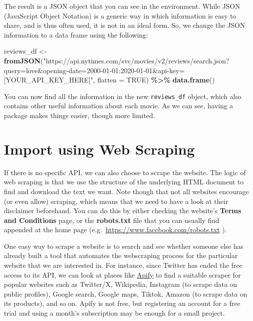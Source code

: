 \documentclass[
]{book}
\newenvironment{Shaded}{\begin{snugshade}}{\end{snugshade}}
\newcommand{\AttributeTok}[1]{\textcolor[rgb]{0.13,0.29,0.53}{#1}}
\newcommand{\ConstantTok}[1]{\textcolor[rgb]{0.56,0.35,0.01}{#1}}
\newcommand{\FunctionTok}[1]{\textcolor[rgb]{0.13,0.29,0.53}{\textbf{#1}}}
\newcommand{\NormalTok}[1]{#1}
\newcommand{\OtherTok}[1]{\textcolor[rgb]{0.56,0.35,0.01}{#1}}
\newcommand{\SpecialCharTok}[1]{\textcolor[rgb]{0.81,0.36,0.00}{\textbf{#1}}}
\newcommand{\StringTok}[1]{\textcolor[rgb]{0.31,0.60,0.02}{#1}}
\begin{document}
The result is a JSON object that you can see in the environment. While JSON (JavaScript Object Notation) is a generic way in which information is easy to share, and is thus often used, it is not in an ideal form. So, we change the JSON information to a data frame using the following:

\begin{Shaded}
\begin{Highlighting}[]
\NormalTok{reviews\_df }\OtherTok{\textless{}{-}} \FunctionTok{fromJSON}\NormalTok{(}\StringTok{"https://api.nytimes.com/svc/movies/v2/reviews/search.json?query=love\&opening{-}date=2000{-}01{-}01:2020{-}01{-}01\&api{-}key=[YOUR\_API\_KEY\_HERE]"}\NormalTok{,}
    \AttributeTok{flatten =} \ConstantTok{TRUE}\NormalTok{) }\SpecialCharTok{\%\textgreater{}\%}
    \FunctionTok{data.frame}\NormalTok{()}
\end{Highlighting}
\end{Shaded}

You can now find all the information in the new \texttt{reviews\_df} object, which also contains other useful information about each movie. As we can see, having a package makes things easier, though more limited.

\section{Import using Web Scraping}\label{import-using-web-scraping}

If there is no specific API, we can also choose to scrape the website. The logic of web scraping is that we use the structure of the underlying HTML document to find and download the text we want. Note though that not all websites encourage (or even allow) scraping, which means that we need to have a look at their disclaimer beforehand. You can do this by either checking the website's \textbf{Terms and Conditions} page, or the \textbf{robots.txt} file that you can usually find appended at the home page (e.g.~\url{https://www.facebook.com/robots.txt} ).

One easy way to scrape a website is to search and see whether someone else has already built a tool that automates the webscraping process for the particular website that we are interested in. For instance, since Twitter has ended the free access to its API, we can look at places like \href{https://apify.com/store?ref=blog.apify.com}{Apify} to find a suitable scraper for popular websites such as Twitter/X, Wikipedia, Instagram (to scrape data on public profiles), Google search, Google maps, Tiktok, Amazon (to scrape data on its products), and so on. Apify is not free, but registering an account for a free trial and using a month's subscription may be enough for a small project.
\end{document}

